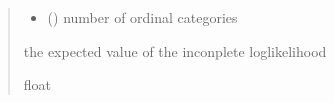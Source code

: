 \documentclass[letterpaper,10pt,english]{sphinxmanual}
\begin{document}
\begin{fulllineitems}
\begin{quote}
\begin{description}
\begin{itemize}
\item {} 
\sphinxAtStartPar
{} () \textendash{} number of ordinal categories

\end{itemize}

\sphinxAtStartPar
the expected value of the inconplete log\sphinxhyphen{}likelihood

\sphinxAtStartPar
float

\end{description}\end{quote}

\end{fulllineitems}

\end{document}
